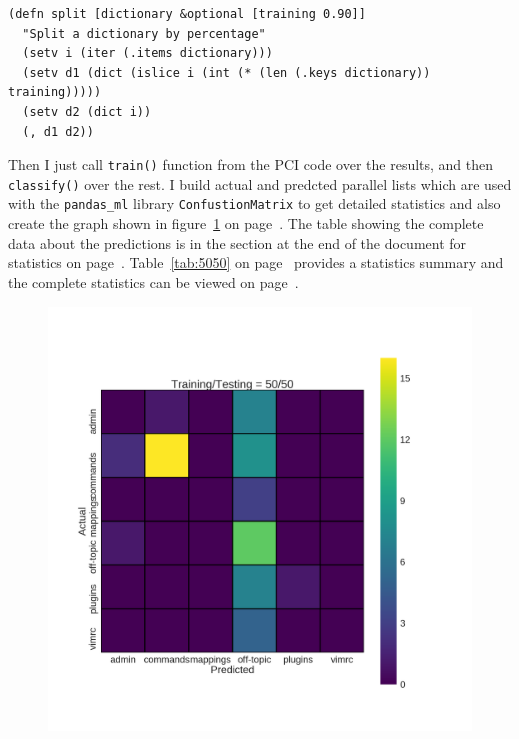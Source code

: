 \documentclass[12pt, a4paper]{article}
\newcommand{\code}[1]{\texttt{#1}}
\begin{document}
\begin{minipage}{\linewidth} %
\vspace{2em}
\begin{verbatim}
(defn split [dictionary &optional [training 0.90]]
  "Split a dictionary by percentage"
  (setv i (iter (.items dictionary)))
  (setv d1 (dict (islice i (int (* (len (.keys dictionary)) training)))))
  (setv d2 (dict i))
  (, d1 d2))
\end{verbatim}
\vspace{2em}
\end{minipage}

Then I just call \code{train()} function from the PCI code over the results, and then \code{classify()} over the rest. I build actual and predcted parallel lists which are used with the \code{pandas\_ml} library \code{ConfustionMatrix} to get detailed statistics and also create the graph shown in figure~\ref{fig:5050} on page~\pageref{fig:5050}. The table showing the complete data about the predictions is in the section at the end of the document for statistics on page~\pageref{sec:5050}. Table~\ref{tab:5050} on page~\pageref{tab:5050} provides a statistics summary and the complete statistics can be viewed on page~\pageref{5050stats}.

\begin{figure}[H]
    \label{fig:5050}
    \includegraphics[width=\textwidth]{../train_validate/heatmaps/50_50.png}
\end{figure}
\end{document}
